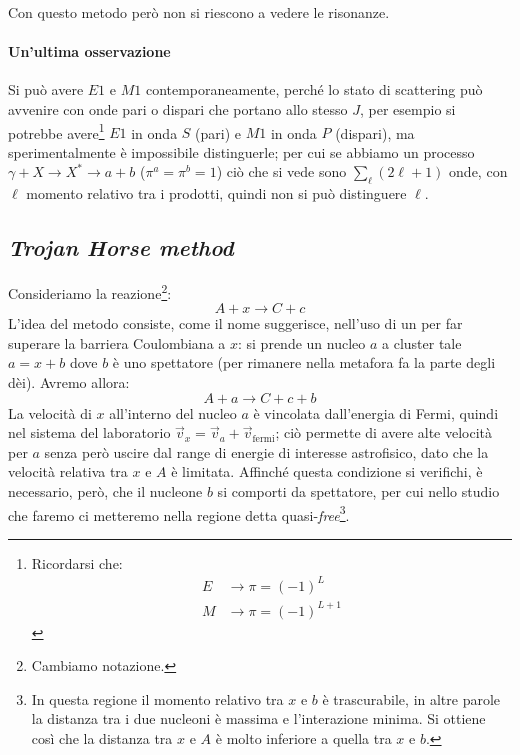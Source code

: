 \noindent Con questo metodo però non si riescono a vedere le risonanze.

\paragraph{Un'ultima osservazione} Si può avere $E1$ e $M1$ contemporaneamente, perché lo stato di scattering può avvenire con onde pari o dispari che portano allo stesso $J$, per esempio si potrebbe avere\footnote{Ricordarsi che:%
\begin{align*}
	E&\to\pi=(-1)^L \\
	M&\to\pi=(-1)^{L+1} 
\end{align*}%
} $E1$ in onda $S$ (pari) e $M1$ in onda $P$ (dispari), ma sperimentalmente è impossibile distinguerle; per cui se abbiamo un processo $\gamma + X \to X^* \to a+b$ ($\pi^a=\pi^b=1$) ciò che si vede sono $\sum_\ell (2\ell+1)$ onde, con $\ell$ momento relativo tra i prodotti, quindi non si può distinguere $\ell$.
\newpage
\subsection{\textit{Trojan Horse method}}\label{sec-THm}
Consideriamo la reazione\footnote{Cambiamo notazione.}:
$$A+x \to C+c$$
L'idea del metodo consiste, come il nome suggerisce, nell'uso di un  per far superare la barriera Coulombiana a $x$: si prende un nucleo $a$ a cluster tale $a=x+b$ dove $b$ è uno spettatore (per rimanere nella metafora fa la parte degli dèi). Avremo allora:
$$A+a \to C+c + b$$
La velocità di $x$ all'interno del nucleo $a$ è vincolata dall'energia di Fermi, quindi nel sistema del laboratorio $\vec{v}_x = \vec{v}_a + \vec{v}_\text{fermi}$; ciò permette di avere alte velocità per $a$ senza però uscire dal range di energie di interesse astrofisico, dato che la velocità relativa tra $x$ e $A$ è limitata. Affinché questa condizione si verifichi, è necessario, però, che il nucleone $b$ si comporti da spettatore, per cui nello studio che faremo ci metteremo nella regione detta quasi-\textit{free}\footnote{In questa regione il momento relativo tra $x$ e $b$ è trascurabile, in altre parole la distanza tra i due nucleoni è massima e l'interazione minima. Si ottiene così che la distanza tra $x$ e $A$ è molto inferiore a quella tra $x$ e $b$.}.


